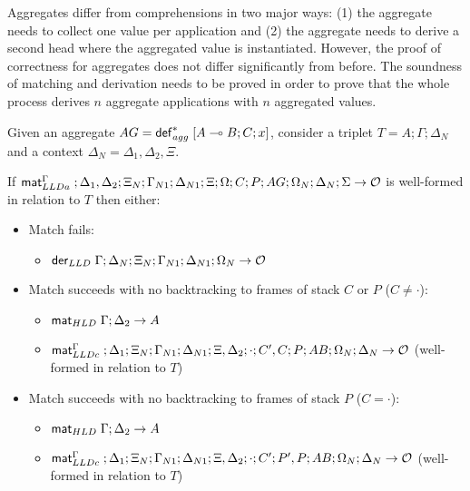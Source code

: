 
Aggregates differ from comprehensions in two major ways: (1) the aggregate needs to
collect one value per application and (2) the aggregate needs to derive a second
head where the aggregated value is instantiated. However, the proof of
correctness for aggregates does not differ significantly from before. The
soundness of matching and derivation needs to be proved in order to prove that
the whole process derives $n$ aggregate applications with $n$ aggregated values.

\begin{lemma}\label{thm:aggregate_body_match}
Given an aggregate $AG = \mathsf{def}_{agg}^{*} \; [A \multimap B ; C; x]$, consider a triplet $T = A; \Gamma;
\Delta_{N}$ and a context $\Delta_{N} = \Delta_1, \Delta_2, \Xi$.

If $\mathsf{mat}_{LLDa}^{\Gamma} \;; \Delta_1, \Delta_2; \Xi_N; \Gamma_{N1}; \Delta_{N1}; \Xi;
\Omega; C; P; AG; \Omega_N; \Delta_N; \Sigma \rightarrow \mathcal{O}$ is well-formed in relation to $T$ then either:

   \begin{itemize}[leftmargin=*]
      \item Match fails:
      \begin{itemize}[leftmargin=\secondm]
         \item $\mathsf{der}_{LLD} \; \Gamma; \Delta_N; \Xi_N; \Gamma_{N1}; \Delta_{N1}; \Omega_N \rightarrow \mathcal{O}$
      \end{itemize}
      
      \item Match succeeds with no backtracking to frames of stack $C$ or $P$
      ($C \neq \cdot$):

      \begin{itemize}[leftmargin=\secondm]
         \item $\mathsf{mat}_{HLD} \; \Gamma; \Delta_2 \rightarrow A$
         \item $\mathsf{mat}_{LLDc}^{\Gamma} \;; \Delta_1; \Xi_N; \Gamma_{N1}; \Delta_{N1}; \Xi,
            \Delta_2; \cdot; C', C; P; AB; \Omega_N; \Delta_N
            \rightarrow \mathcal{O}$ (well-formed in relation to
                  $T$)
      \end{itemize}

      \item Match succeeds with no backtracking to frames of stack $P$ ($C =
            \cdot$):
      \begin{itemize}[leftmargin=\secondm]
         \item $\mathsf{mat}_{HLD} \; \Gamma; \Delta_2 \rightarrow A$
         \item $\mathsf{mat}_{LLDc}^{\Gamma} \;; \Delta_1; \Xi_N; \Gamma_{N1}; \Delta_{N1}; \Xi,
            \Delta_2; \cdot; C'; P', P; AB; \Omega_N; \Delta_N
            \rightarrow \mathcal{O}$ (well-formed in relation to
                  $T$)
      \end{itemize}


\end{itemize}
\end{lemma}
